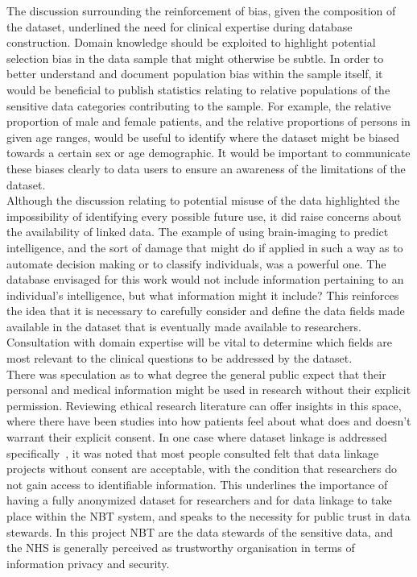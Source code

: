 \documentclass{article}
\begin{document}
The discussion surrounding the reinforcement of bias, given the
composition of the dataset, underlined the need for clinical expertise
during database construction. Domain knowledge should be exploited to
highlight potential selection bias in the data sample that might
otherwise be subtle. In order to better understand and document
population bias within the sample itself, it would be beneficial to
publish statistics relating to relative populations of the sensitive data
categories contributing to the sample. For example, the relative
proportion of male and female patients, and the relative proportions
of persons in given age ranges, would be useful to identify where the dataset might be biased towards a certain
sex or age demographic.
It would be important to communicate these biases clearly to data
users to ensure an awareness of the limitations of the dataset.\\
 
Although the discussion relating to potential misuse of the data
highlighted the impossibility of identifying every possible future
use, it did raise concerns about the availability of linked data.
The example of using brain-imaging to predict intelligence, and the
sort of damage that might do if applied in such a way as to automate
decision making or to classify individuals, was a powerful one. The
database envisaged for this work would not include information
pertaining to an individual's intelligence, but what information might
it include? This reinforces the idea that it is necessary to carefully
consider and define the data fields made available in the dataset that
is eventually made available to researchers. Consultation with
domain expertise will be vital to determine which fields are most
relevant to the clinical questions to be addressed by the dataset.\\

There was speculation as to what degree the general public expect that
their personal and medical information might be used in research
without their explicit permission. Reviewing ethical research
literature can offer insights in this space, where there have been
studies into how patients feel about what does and doesn't warrant
their explicit consent. In one case where dataset linkage is addressed
specifically~\cite{xafis}, it was noted that most people consulted
felt that data linkage projects without consent are acceptable,
with the condition that researchers do not gain access to identifiable
information. This underlines the importance of having a fully
anonymized dataset for researchers and for data linkage to take place
within the NBT system, and speaks to the necessity for public trust in data
stewards. In this project NBT are the data stewards of the sensitive
data, and the NHS is generally perceived as trustworthy organisation in terms
of information privacy and security.  \\
\end{document}
